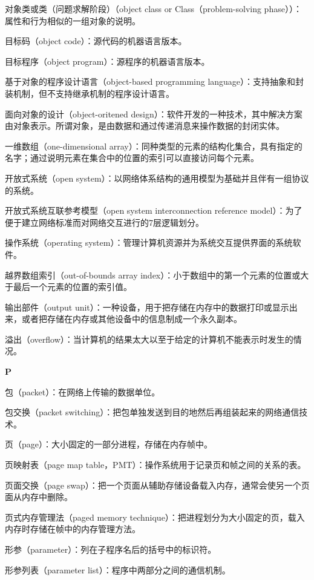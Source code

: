 对象类或类（问题求解阶段）（object class or Class（problem-solving phase））：属性和行为相似的一组对象的说明。

目标码（object code）：源代码的机器语言版本。

目标程序（object program）：源程序的机器语言版本。

基于对象的程序设计语言（object-based programming language）：支持抽象和封装机制，但不支持继承机制的程序设计语言。

面向对象的设计（object-oritened design）：软件开发的一种技术，其中解决方案由对象表示。所谓对象，是由数据和通过传递消息来操作数据的封闭实体。

一维数组（one-dimensional array）：同种类型的元素的结构化集合，具有指定的名字；通过说明元素在集合中的位置的索引可以直接访问每个元素。

开放式系统（open system）：以网络体系结构的通用模型为基础并且伴有一组协议的系统。

开放式系统互联参考模型（open system interconnection reference model）：为了便于建立网络标准而对网络交互进行的7层逻辑划分。

操作系统（operating system）：管理计算机资源并为系统交互提供界面的系统软件。

越界数组索引（out-of-bounds array index）：小于数组中的第一个元素的位置或大于最后一个元素的位置的索引值。

输出部件（output unit）：一种设备，用于把存储在内存中的数据打印或显示出来，或者把存储在内存或其他设备中的信息制成一个永久副本。

溢出（overflow）：当计算机的结果太大以至于给定的计算机不能表示时发生的情况。

\textbf{P}


包（packet）：在网络上传输的数据单位。

包交换（packet switching）：把包单独发送到目的地然后再组装起来的网络通信技术。

页（page）：大小固定的一部分进程，存储在内存帧中。

页映射表（page map table，PMT）：操作系统用于记录页和帧之间的关系的表。

页面交换（page swap）：把一个页面从辅助存储设备载入内存，通常会使另一个页面从内存中删除。

页式内存管理法（paged memory technique）：把进程划分为大小固定的页，载入内存时存储在帧中的内存管理方法。

形参（parameter）：列在子程序名后的括号中的标识符。

形参列表（parameter list）：程序中两部分之间的通信机制。

